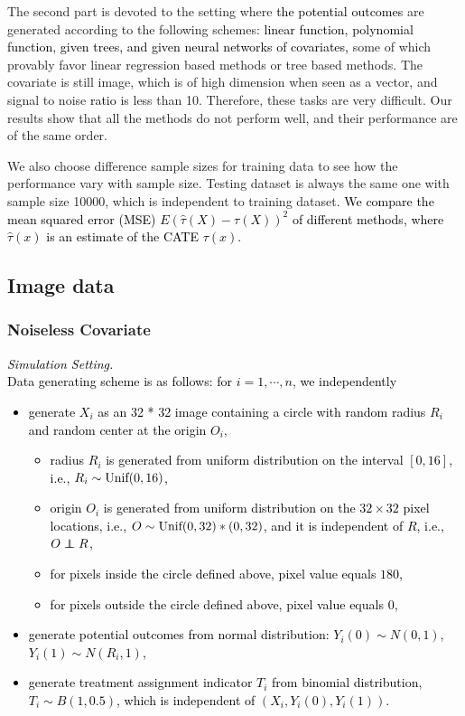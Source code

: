 \documentclass[11pt,paper=letter]{scrartcl}
\def\Unif{\textnormal{Unif}}
\newcommand\independent{\protect\mathpalette{\protect\independenT}{\perp}}
\def\independenT#1#2{\mathrel{\rlap{$#1#2$}\mkern2mu{#1#2}}}
\newcommand\hz[1]{\textcolor{black}{#1}}
\begin{document}

The second part is devoted to the setting where \hz{the potential outcomes} are generated according to the following schemes: \hz{linear function, polynomial function, given trees, and given neural networks of covariates,} some of which provably favor linear regression based methods or tree based methods. The covariate is still image, which is of high dimension when seen as a vector, and signal to noise \hz{ratio} is less than 10. Therefore, these tasks are very difficult. Our results show that all the methods do not perform well, and their performance are of the same order.

We also choose difference sample sizes for training data to see how the performance vary with sample size. Testing dataset is always the same one with sample size 10000, which is independent to training dataset. \hz{We compare the mean squared error (MSE) $E\left( \hat \tau(X) - \tau(X) \right)^2 $ of different methods, where $\hat \tau(x)$ is an estimate of the CATE $\tau (x)$.}


\subsection{Image data}
\subsubsection{Noiseless Covariate}

\hz{
\textit{Simulation Setting.}\\
Data generating scheme is as follows: for $i=1,\cdots,n$, we independently
\begin{itemize}
\item generate $X_i$ as an 32 * 32 image \hz{containing a circle with random radius $R_i$ and random center at the origin $O_i$},
\begin{itemize}
\item radius $R_i$ is generated from uniform distribution on the interval $[0,16]$, i.e., $R_i \sim \Unif(0,16)$,
\item origin $O_i$ is generated from uniform distribution on the $32 \times 32$ pixel locations, i.e., $O \sim \Unif (0,32)*(0,32) $, and it is independent of $R$, i.e., $ O \independent R$,
\item for pixels inside the circle defined above, pixel value equals $180$,
\item for pixels outside the circle defined above, pixel value equals $0$,
\end{itemize}
\item generate potential outcomes from normal distribution: $Y_i(0) \sim N(0,1)$, $Y_i(1) \sim N(R_i,1)$,
\item generate treatment assignment indicator $T_i$ from binomial distribution, $T_i \sim B(1,0.5)$, which is independent of $(X_i, Y_i(0),Y_i(1))$.
\end{itemize}
}
\end{document}
